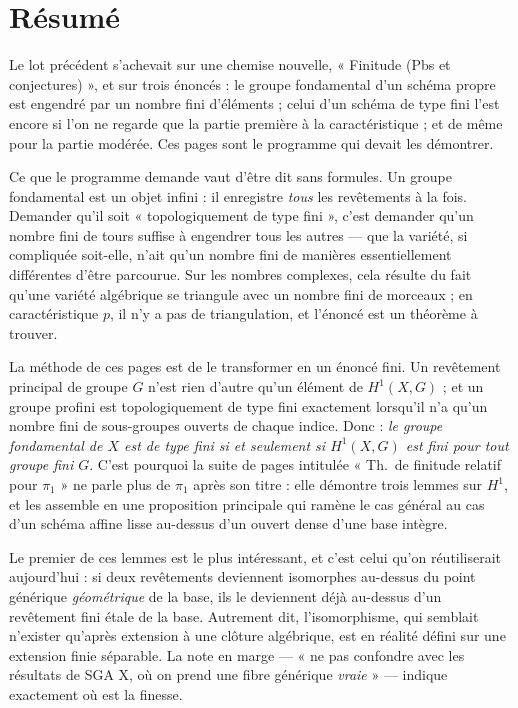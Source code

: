 \documentclass[11pt,a4paper]{article}
\begin{document}
\section*{Résumé}

\begin{resume}
Le lot précédent s'achevait sur une chemise nouvelle, « Finitude (Pbs et
conjectures) », et sur trois énoncés : le groupe fondamental d'un schéma propre
est engendré par un nombre fini d'éléments ; celui d'un schéma de type fini
l'est encore si l'on ne regarde que la partie première à la caractéristique ;
et de même pour la partie modérée. Ces pages sont le programme qui devait les
démontrer.

Ce que le programme demande vaut d'être dit sans formules. Un groupe
fondamental est un objet infini : il enregistre \emph{tous} les revêtements à
la fois. Demander qu'il soit « topologiquement de type fini », c'est demander
qu'un nombre fini de tours suffise à engendrer tous les autres --- que la
variété, si compliquée soit-elle, n'ait qu'un nombre fini de manières
essentiellement différentes d'être parcourue. Sur les nombres complexes, cela
résulte du fait qu'une variété algébrique se triangule avec un nombre fini de
morceaux ; en caractéristique $p$, il n'y a pas de triangulation, et l'énoncé
est un théorème à trouver.

La méthode de ces pages est de le transformer en un énoncé fini. Un revêtement
principal de groupe $G$ n'est rien d'autre qu'un élément de $H^{1}(X, G)$ ;
et un groupe profini est topologiquement de type fini exactement lorsqu'il n'a
qu'un nombre fini de sous-groupes ouverts de chaque indice. Donc : \emph{le
groupe fondamental de $X$ est de type fini si et seulement si $H^{1}(X,G)$ est
fini pour tout groupe fini $G$}. C'est pourquoi la suite de pages intitulée
« Th.\ de finitude relatif pour $\pi_{1}$ » ne parle plus de $\pi_{1}$ après
son titre : elle démontre trois lemmes sur $H^{1}$, et les assemble en une
proposition principale qui ramène le cas général au cas d'un schéma affine
lisse au-dessus d'un ouvert dense d'une base intègre.

Le premier de ces lemmes est le plus intéressant, et c'est celui qu'on
réutiliserait aujourd'hui : si deux revêtements deviennent isomorphes au-dessus
du point générique \emph{géométrique} de la base, ils le deviennent déjà
au-dessus d'un revêtement fini étale de la base. Autrement dit,
l'isomorphisme, qui semblait n'exister qu'après extension à une clôture
algébrique, est en réalité défini sur une extension finie séparable. La note en
marge --- « ne pas confondre avec les résultats de SGA X, où on prend une fibre
générique \emph{vraie} » --- indique exactement où est la finesse.


\end{resume}
\end{document}
